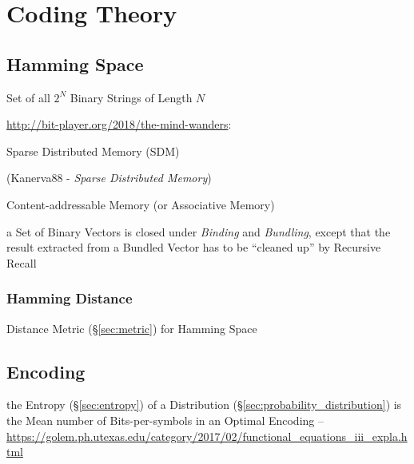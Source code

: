 \section{Coding Theory}\label{sec:coding_theory}

\subsection{Hamming Space}\label{sec:hamming_space}

Set of all $2^N$ Binary Strings of Length $N$


\url{http://bit-player.org/2018/the-mind-wanders}:

Sparse Distributed Memory (SDM)

(Kanerva88 - \emph{Sparse Distributed Memory})

Content-addressable Memory (or Associative Memory)

a Set of Binary Vectors is closed under \emph{Binding} and \emph{Bundling},
except that the result extracted from a Bundled Vector has to be ``cleaned up''
by Recursive Recall



\subsubsection{Hamming Distance}\label{sec:hamming_distance}

Distance Metric (\S\ref{sec:metric}) for Hamming Space



\subsection{Encoding}\label{sec:encoding}

the Entropy (\S\ref{sec:entropy}) of a Distribution
(\S\ref{sec:probability_distribution}) is the Mean number of
Bits-per-symbols in an Optimal Encoding --
\url{https://golem.ph.utexas.edu/category/2017/02/functional_equations_iii_expla.html}

